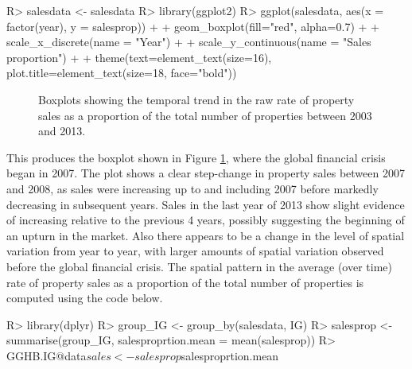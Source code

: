 \documentclass[article, nojss]{jss}
\begin{document}
\begin{Schunk}
\begin{Sinput}
R>  salesdata <- salesdata %
R>  library(ggplot2)
R>  ggplot(salesdata, aes(x = factor(year), y = salesprop)) +
+     geom_boxplot(fill="red", alpha=0.7) + 
+     scale_x_discrete(name = "Year") +
+     scale_y_continuous(name = "Sales proportion") + 
+     theme(text=element_text(size=16), plot.title=element_text(size=18, face="bold")) 
\end{Sinput}
\end{Schunk}


\begin{figure}
\centering 
{}
\caption{Boxplots showing the temporal trend in the raw rate of property sales as a proportion of the total number of properties between 2003 and 2013.\label{salesboxplot}}
\end{figure} 


This produces the boxplot shown in Figure \ref{salesboxplot}, where the global financial crisis began in 2007. The plot shows a clear step-change in property sales between 2007 and 2008, as sales were increasing up to and including 2007 before markedly decreasing in subsequent years. Sales in the last year of 2013 show slight evidence of increasing relative to the previous 4 years, possibly suggesting the beginning of an upturn in the market. Also there appears to be a change in the level of spatial variation from year to year, with larger amounts of spatial variation observed before the global financial crisis. The spatial pattern in the average (over time) rate of property sales as a proportion of the total number of properties is computed using the code below.

\begin{Schunk}
\begin{Sinput}
R>  library(dplyr)
R>  group_IG <- group_by(salesdata, IG)
R>  salesprop <- summarise(group_IG, salesproprtion.mean = mean(salesprop))
R>  GGHB.IG@data$sales <- salesprop$salesproprtion.mean
\end{Sinput}
\end{Schunk}
\end{document}
